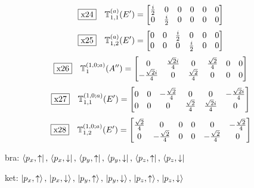 \documentclass[fleqn,10pt,landscape]{jsarticle}
\begin{document}
\begin{dmath*}
\fbox{x24}\quad \mathbb{T}_{1,1}^{(a)}(E^{\prime})=\begin{bmatrix} \frac{i}{2} & 0 & 0 & 0 & 0 & 0 \\ 0 & \frac{i}{2} & 0 & 0 & 0 & 0 \end{bmatrix}
\end{dmath*}
\begin{dmath*}
\fbox{x25}\quad \mathbb{T}_{1,2}^{(a)}(E^{\prime})=\begin{bmatrix} 0 & 0 & \frac{i}{2} & 0 & 0 & 0 \\ 0 & 0 & 0 & \frac{i}{2} & 0 & 0 \end{bmatrix}
\end{dmath*}
\begin{dmath*}
\fbox{x26}\quad \mathbb{T}_{1}^{(1,0;a)}(A^{\prime\prime})=\begin{bmatrix} 0 & \frac{\sqrt{2} i}{4} & 0 & \frac{\sqrt{2}}{4} & 0 & 0 \\ - \frac{\sqrt{2} i}{4} & 0 & \frac{\sqrt{2}}{4} & 0 & 0 & 0 \end{bmatrix}
\end{dmath*}
\begin{dmath*}
\fbox{x27}\quad \mathbb{T}_{1,1}^{(1,0;a)}(E^{\prime})=\begin{bmatrix} 0 & 0 & - \frac{\sqrt{2}}{4} & 0 & 0 & - \frac{\sqrt{2} i}{4} \\ 0 & 0 & 0 & \frac{\sqrt{2}}{4} & \frac{\sqrt{2} i}{4} & 0 \end{bmatrix}
\end{dmath*}
\begin{dmath*}
\fbox{x28}\quad \mathbb{T}_{1,2}^{(1,0;a)}(E^{\prime})=\begin{bmatrix} \frac{\sqrt{2}}{4} & 0 & 0 & 0 & 0 & - \frac{\sqrt{2}}{4} \\ 0 & - \frac{\sqrt{2}}{4} & 0 & 0 & - \frac{\sqrt{2}}{4} & 0 \end{bmatrix}
\end{dmath*}
\vspace{5mm}

\noindent\textbullet\, bra: $\bra{p_{x},\uparrow},\, \bra{p_{x},\downarrow},\, \bra{p_{y},\uparrow},\, \bra{p_{y},\downarrow},\, \bra{p_{z},\uparrow},\, \bra{p_{z},\downarrow}$

\noindent\textbullet\, ket: $\ket{p_{x},\uparrow},\, \ket{p_{x},\downarrow},\, \ket{p_{y},\uparrow},\, \ket{p_{y},\downarrow},\, \ket{p_{z},\uparrow},\, \ket{p_{z},\downarrow}$
\end{document}
